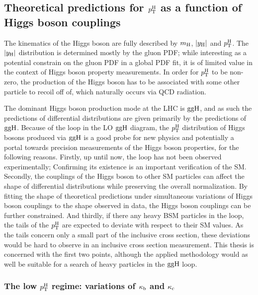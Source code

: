 \subsection{Theoretical predictions for \texorpdfstring{$p_\mathrm{T}^\mathrm{H}$}{pTH} as a function of Higgs boson couplings}


The kinematics of the Higgs boson are fully described by $m_{\mathrm{H}}$, $\left|y_\mathrm{H}\right| $ and $p_\mathrm{T}^\mathrm{H}$.
% 
The $\left|y_\mathrm{H}\right| $ distribution is determined mostly by the gluon PDF; while interesting as a potential constrain on the gluon PDF in a global PDF fit, it is of limited value in the context of Higgs boson property measurements.
% 
In order for $p_\mathrm{T}^\mathrm{H}$ to be non-zero, the production of the Higgs boson has to be associated with some other particle to recoil off of, which naturally occurs via QCD radiation.


The dominant Higgs boson production mode at the LHC is $\mathrm{g}\mathrm{g}\mathrm{H}$, and as such the predictions of differential distributions are given primarily by the predictions of $\mathrm{g}\mathrm{g}\mathrm{H}$.
% 
Because of the loop in the LO $\mathrm{g}\mathrm{g}\mathrm{H}$ diagram, the $p_\mathrm{T}^\mathrm{H}$ distribution of Higgs bosons produced via $\mathrm{g}\mathrm{g}\mathrm{H}$ is a good probe for new physics and potentially a portal towards precision measurements of the Higgs boson properties, for the following reasons.
% 
Firstly, up until now, the loop has not been observed experimentally; Confirming its existence is an important verification of the SM.
% 
Secondly, the couplings of the Higgs boson to other SM particles can affect the shape of differential distributions while preserving the overall normalization.
% 
By fitting the shape of theoretical predictions under simultaneous variations of Higgs boson couplings to the shape observed in data, the Higgs boson couplings can be further constrained.
% 
And thirdly, if there any heavy BSM particles in the loop, the tails of the $p_\mathrm{T}^\mathrm{H}$ are expected to deviate with respect to their SM values.
% 
As the tails concern only a small part of the inclusive cross section, these deviations would be hard to observe in an inclusive cross section measurement.
% 
This thesis is concerned with the first two points, although the applied methodology would as well be suitable for a search of heavy particles in the $\mathrm{g}\mathrm{g}\mathrm{H}$ loop.


\subsubsection{The low \texorpdfstring{$p_\mathrm{T}^\mathrm{H}$}{pTH} regime: variations of \texorpdfstring{$\kappa_{\mathrm{b}}$}{kb} and \texorpdfstring{$\kappa_{\mathrm{c}}$}{kc}}

